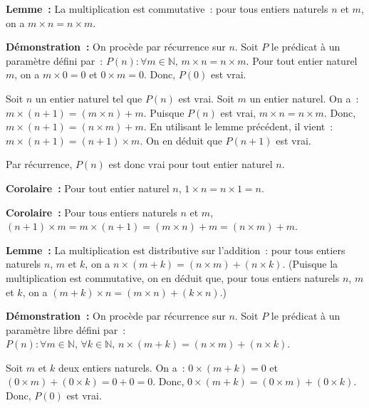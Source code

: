    \done 

\medskip

\noindent\textbf{Lemme :} La multiplication est commutative : pour tous entiers naturels $n$ et $m$, on a $m \times n = n \times m$.

\medskip

\noindent\textbf{Démonstration :} On procède par récurrence sur $n$. 
    Soit $P$ le prédicat à un paramètre défini par : $P(n): \forall m \in \mathbb{N}, \, m \times n = n \times m$. 
    Pour tout entier naturel $m$, on a $m \times 0 = 0$ et $0 \times m = 0$. 
    Donc, $P(0)$ est vrai. 

    Soit $n$ un entier naturel tel que $P(n)$ est vrai. 
    Soit $m$ un entier naturel. 
    On a : $m \times (n+1) = (m \times n) + m$. 
    Puisque $P(n)$ est vrai, $m \times n = n \times m$. 
    Donc, $m \times (n+1) = (n \times m) + m$. 
    En utilisant le lemme précédent, il vient : $m \times (n+1) = (n+1) \times m$. 
    On en déduit que $P(n+1)$ est vrai. 

    Par récurrence, $P(n)$ est donc vrai pour tout entier naturel $n$. 

   \done 

\medskip

\noindent\textbf{Corolaire :} Pour tout entier naturel $n$, $1 \times n = n \times 1 = n$. 

\medskip

\noindent\textbf{Corolaire :} Pour tous entiers naturels $n$ et $m$, $(n+1) \times m = m \times (n+1) = (m \times n) + m = (n \times m) + m$. 

\medskip

\noindent\textbf{Lemme :} La multiplication est distributive sur l'addition : pour tous entiers naturels $n$, $m$ et $k$, on a $n \times (m + k) = (n \times m) + (n \times k)$.
    (Puisque la multiplication est commutative, on en déduit que, pour tous entiers naturels $n$, $m$ et $k$, on a $(m + k) \times n = (m \times n) + (k \times n)$.)

\medskip

\noindent\textbf{Démonstration :} On procède par récurrence sur $n$. 
    Soit $P$ le prédicat à un paramètre libre défini par : $P(n): \forall m \in \mathbb{N}, \, \forall k \in \mathbb{N}, \, n \times (m + k) = (n \times m) + (n \times k)$.

    Soit $m$ et $k$ deux entiers naturels. 
    On a : $0 \times (m+k) = 0$ et $(0 \times m) + (0 \times k) = 0 + 0 = 0$. 
    Donc, $0 \times (m+k) = (0 \times m) + (0 \times k)$. 
    Donc, $P(0)$ est vrai. 

